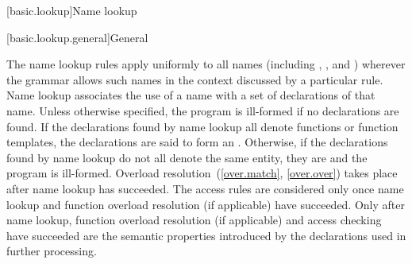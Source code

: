 
[basic.lookup]{Name lookup}%


[basic.lookup.general]{General}%
%

\pnum
The name lookup rules apply uniformly to all names (including
,
, and
) wherever the grammar allows
such names in the context discussed by a particular rule. Name lookup
associates the use of a name with a set of declarations of
that name.
Unless otherwise specified,
the program is ill-formed if no declarations are found.
If the declarations found by name lookup
all denote functions or function templates,
the declarations are said to form an .
Otherwise,
if the declarations found by name lookup do not all denote the same entity,
%
they are  and the program is ill-formed.
Overload resolution~(\ref{over.match}, \ref{over.over})
takes place after name lookup has succeeded. The access rules
are considered only once name lookup and
function overload resolution (if applicable) have succeeded. Only after
name lookup, function overload resolution (if applicable) and access
checking have succeeded
are the semantic properties introduced by the declarations
used in further processing.

